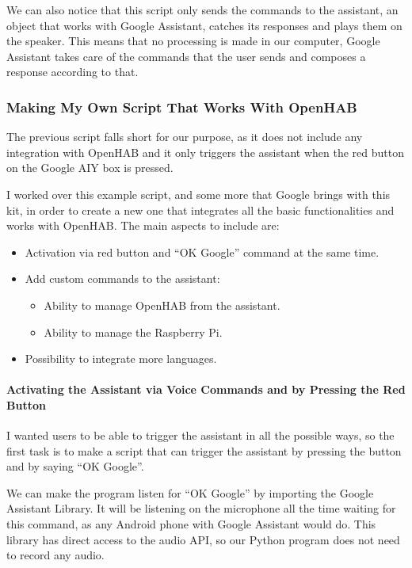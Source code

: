 We can also notice that this script only sends the commands to the assistant, an object that works with Google Assistant, catches 
its responses and plays them on the speaker. This means that no processing is made in our computer, Google Assistant takes care 
of the commands that the user sends and composes a response according to that.

\subsubsection{Making My Own Script That Works With OpenHAB}
The previous script falls short for our purpose, as it does not include any integration with OpenHAB and it only triggers the 
assistant when the red button on the Google AIY box is pressed.

I worked over this example script, and some more that Google brings with this kit, in order to create a new one that integrates 
all the basic functionalities and works with OpenHAB. The main aspects to include are:
\begin{itemize}
    \item Activation via red button and “OK Google” command at the same time.
    \item Add custom commands to the assistant:
    \begin{itemize}
        \item Ability to manage OpenHAB from the assistant.
        \item Ability to manage the Raspberry Pi.
    \end{itemize}
    \item Possibility to integrate more languages.
\end{itemize}

\paragraph{Activating the Assistant via Voice Commands and by Pressing the Red Button}
I wanted users to be able to trigger the assistant in all the possible ways, so the first task is to make a script that can trigger 
the assistant by pressing the button and by saying “OK Google”.

We can make the program listen for “OK Google” by importing the Google Assistant Library. It will be listening on the microphone 
all the time waiting for this command, as any Android phone with Google Assistant would do. This library has direct access to the 
audio API, so our Python program does not need to record any audio.

